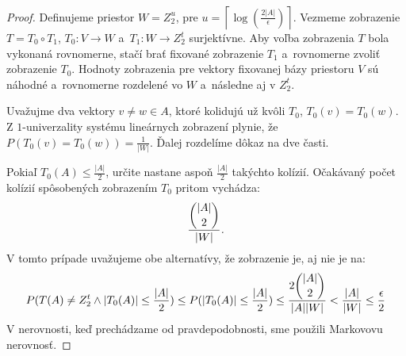 \begin{proof}
Definujeme priestor $W = Z_2^u$, pre $u = \left\lceil \log (\frac{2|A|}{\epsilon}) \right\rceil$. Vezmeme zobrazenie $T = T_0 \circ T_1$, $T_0: V \rightarrow W$ a~$T_1: W \rightarrow Z_2^t$ surjektívne. Aby voľba zobrazenia $T$ bola vykonaná rovnomerne, stačí brať fixované zobrazenie $T_1$ a~rovnomerne zvoliť zobrazenie $T_0$. Hodnoty zobrazenia pre vektory fixovanej bázy priestoru $V$ sú náhodné a~rovnomerne rozdelené vo $W$ a~následne aj v $Z_2^t$.

Uvažujme dva vektory $v \neq w \in A$, ktoré kolidujú už kvôli $T_0$, $T_0(v) = T_0(w)$. Z $1$-univerzality systému lineárnych zobrazení plynie, že $P(T_0(v) = T_0(w)) = \frac{1}{|W|}$. Ďalej rozdelíme dôkaz na dve časti. 

Pokiaľ $T_0(A) \leq \frac{|A|}{2}$, určite nastane aspoň $\frac{|A|}{2}$ takýchto kolízií. Očakávaný počet kolízií spôsobených zobrazením $T_0$ pritom vychádza:
\[
\frac{\dbinom{|A|}{2}}{|W|}\textit{.}
\]
V tomto prípade uvažujeme obe alternatívy, že zobrazenie je, aj nie je na:
\begin{displaymath}
P(T(A) \neq Z_2^t \wedge |T_0(A)| \leq \frac{|A|}{2}) \leq P(|T_0(A)| \leq \frac{|A|}{2}) \leq \frac{2 \dbinom{|A|}{2}}{|A||W|} < \frac{|A|}{|W|} \leq \frac{\epsilon}{2}
\end{displaymath}
V nerovnosti, keď prechádzame od pravdepodobnosti, sme použili Markovovu nerovnosť.


\end{proof}
